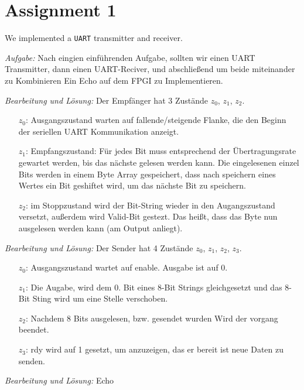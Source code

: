 \section*{Assignment 1}
We implemented a \texttt{UART} transmitter and receiver.

\emph{Aufgabe: }Nach eingien einführenden Aufgabe, sollten wir einen UART Transmitter, dann einen UART-Reciver, und abschließend um beide miteinander zu Kombinieren Ein Echo auf dem FPGI zu Implementieren.


\emph{Bearbeitung und Lösung: }Der Empfänger hat 3 Zustände $z_0$, $z_1$, $z_2$.\begin{itemize}


\item[$z_0$:] Ausgangszustand warten auf fallende/steigende Flanke, die den Beginn der seriellen UART Kommunikation anzeigt.
\item[$z_1$:] Empfangszustand: Für jedes Bit muss entsprechend der Übertragungsrate gewartet werden, bis das nächste gelesen werden kann. Die eingelesenen einzel Bits werden in einem Byte Array gespeichert, dass nach speichern eines Wertes ein Bit geshiftet wird, um das nächste Bit zu speichern. 
\item[$z_2$:] im Stoppzustand wird der Bit-String wieder in den Augangszustand versetzt, außerdem wird Valid-Bit gestezt. Das heißt, dass das Byte nun ausgelesen werden kann (am Output anliegt). 
\end{itemize}

\emph{Bearbeitung und Lösung: }Der Sender hat 4 Zustände $z_0$, $z_1$, $z_2$, $z_3$.\begin{itemize}


\item[$z_0$:] Ausgangszustand wartet auf enable. Ausgabe ist auf 0.
\item[$z_1$:] Die Augabe, wird dem 0. Bit eines 8-Bit Strings gleichgesetzt und das 8-Bit Sting wird um eine Stelle verschoben.
\item[$z_2$:] Nachdem 8 Bits ausgelesen, bzw. gesendet wurden Wird der vorgang beendet.
\item[$z_3$:] rdy wird auf 1 gesetzt, um anzuzeigen, das er bereit ist neue Daten zu senden. 

\end{itemize}

\emph{Bearbeitung und Lösung: } Echo 